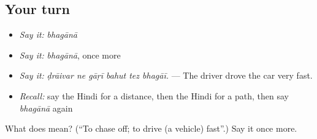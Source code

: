 \subsection*{Your turn}
\begin{itemize}
\raggedright
  \item \emph{Say it:} \emph{bhagānā}
  \item \emph{Say it:} \emph{bhagānā}, once more
  \item \emph{Say it:} \emph{ḍrāivar ne gāṛī bahut tez bhagāī.} — The driver drove the car very fast.
  \item \emph{Recall:} say the Hindi for a distance, then the Hindi for a path, then say \emph{bhagānā} again
\end{itemize}

\begin{tcolorbox}[breakable,colback=teal!4,colframe=teal!35!black,title={Before you move on}]
What does  mean? (\textquotedblleft{}To chase off; to drive (a vehicle) fast\textquotedblright{}.) Say it once more.
\end{tcolorbox}
